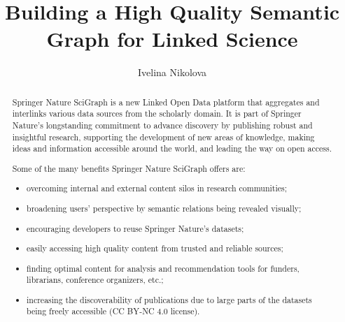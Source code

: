 \documentclass[runningheads,a4paper]{llncs}
\begin{document}
\mainmatter

\title{Building a High Quality Semantic Graph for Linked Science}
\author{Ivelina Nikolova}

\maketitle

\begin{abstract}
Springer Nature SciGraph is a new Linked Open Data platform that aggregates and interlinks various data sources from the scholarly domain. It is part of Springer Nature's longstanding commitment to advance discovery by publishing robust and insightful research, supporting the development of new areas of knowledge, making ideas and information accessible around the world, and leading the way on open access. 

Some of the many benefits Springer Nature SciGraph offers are: 
\begin{itemize}
\item overcoming internal and external content silos in research communities; 
\item broadening users' perspective by semantic relations being revealed visually; 
\item encouraging developers to reuse Springer Nature's datasets; 
\item easily accessing high quality content from trusted and reliable sources; 
\item finding optimal content for analysis and recommendation tools for funders, librarians, conference organizers, etc.; 
\item increasing the discoverability of publications due to large parts of the datasets being freely accessible (CC BY-NC 4.0 license).
\end{itemize}

\end{abstract}
\end{document}
